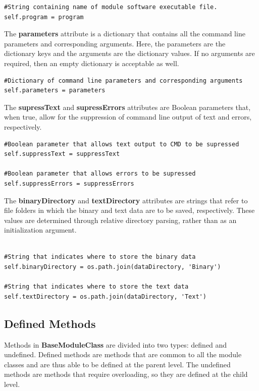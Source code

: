 \begin{lstlisting}[frame=single]  
#String containing name of module software executable file. 
self.program = program
\end{lstlisting}

The \textbf{parameters} attribute is a dictionary that contains all the command line parameters and corresponding arguments. Here, the parameters are the dictionary keys and the arguments are the dictionary values. If no arguments are required, then an empty dictionary is acceptable as well. 

\begin{lstlisting}[frame=single]   
#Dictionary of command line parameters and corresponding arguments
self.parameters = parameters
\end{lstlisting}

The \textbf{supressText} and \textbf{supressErrors} attributes are Boolean parameters that, when true, allow for the suppression of command line output of text and errors, respectively.

\begin{lstlisting}[frame=single]   
#Boolean parameter that allows text output to CMD to be supressed
self.suppressText = suppressText

#Boolean parameter that allows errors to be supressed
self.suppressErrors = suppressErrors
\end{lstlisting}

The \textbf{binaryDirectory} and \textbf{textDirectory} attributes are strings that refer to file folders in which the binary and text data are to be saved, respectively. These values are determined through relative directory parsing, rather than as an initialization argument. \\\\

\begin{lstlisting}[frame=single]   	
#String that indicates where to store the binary data
self.binaryDirectory = os.path.join(dataDirectory, 'Binary')

#String that indicates where to store the text data
self.textDirectory = os.path.join(dataDirectory, 'Text')
\end{lstlisting}


\subsection{Defined Methods}
Methods in \textbf{BaseModuleClass} are divided into two types: defined and undefined. Defined methods are methods that are common to all the module classes and are thus able to be defined at the parent level. The undefined methods are methods that require overloading, so they are defined at the child level. 

